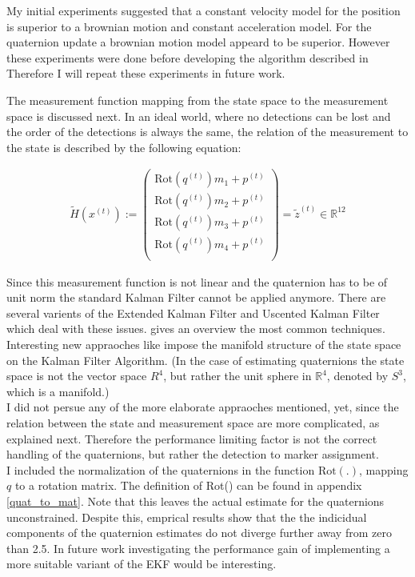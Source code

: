 \documentclass{article}
\begin{document}
My initial experiments suggested that a constant velocity model for the position is superior to a brownian motion and constant acceleration model. For the quaternion update a brownian motion model appeard to be superior. However these experiments were done before developing the algorithm described in %
Therefore I will repeat these experiments in future work.


The measurement function mapping from the state space to the measurement space is discussed next. In an ideal world, where no detections can be lost and the order of the detections is always the same, the relation of the measurement to the state is described by the following equation:

\begin{eqnarray}
\tilde{H}(x^{(t)}) := \begin{pmatrix}
\text{Rot}(q^{(t)})m_1 + p^{(t)} \\
\text{Rot}(q^{(t)})m_2 + p^{(t)} \\
\text{Rot}(q^{(t)})m_3 + p^{(t)} \\
\text{Rot}(q^{(t)})m_4 + p^{(t)} \\
\end{pmatrix} = \tilde{z}^{(t)} \in \mathbb{R}^{12}
\end{eqnarray}

Since this measurement function is not linear and the quaternion has to be of unit norm the standard Kalman Filter cannot be applied anymore. There are several varients of the Extended Kalman Filter and Uscented Kalman Filter which deal with these issues. \cite{attitude_estimation} gives an overview the most common techniques. Interesting new appraoches like \cite{manifolds} impose the manifold structure of the state space on the Kalman Filter Algorithm. (In the case of estimating quaternions the state space is not the vector space $R^4$, but rather the unit sphere in $\mathbb{R}^4$, denoted by $S^3$, which is a manifold.)\\
I did not persue any of the more elaborate appraoches mentioned, yet, since the relation between the state and measurement space are more complicated, as explained next. Therefore the performance limiting factor is not the correct handling of the quaternions, but rather the detection to marker assignment.\\
I included the normalization of the quaternions in the function $\text{Rot}(.)$, mapping $q$ to a rotation matrix. The definition of Rot() can be found in appendix \ref{quat_to_mat}. Note that this leaves the actual estimate for the quaternions unconstrained. Despite this, emprical results show that the the indicidual components of the quaternion estimates do not diverge further away from zero than 2.5. In future work investigating the performance gain of implementing a more suitable variant of the EKF would be interesting.
\end{document}
